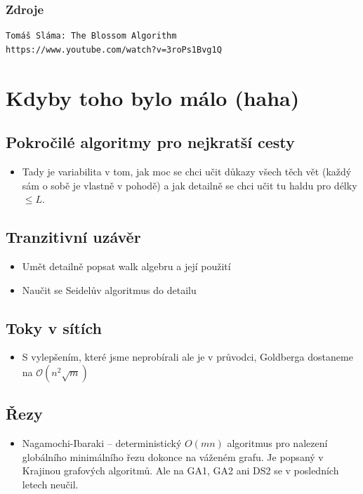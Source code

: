 \documentclass{article}
\theoremstyle{noparens}
\theoremstyle{noparens-mys}
\theoremstyle{noparens-note}
\newcommand{\OO}{\mathcal{O}}
\begin{document}
\subsubsection*{Zdroje}

\begin{verbatim}
Tomáš Sláma: The Blossom Algorithm
https://www.youtube.com/watch?v=3roPs1Bvg1Q
\end{verbatim}


\newpage
\section{Kdyby toho bylo málo (haha)}

\subsection{Pokročilé algoritmy pro nejkratší cesty}
\begin{itemize}
    \item Tady je variabilita v tom, jak moc se chci učit důkazy všech těch vět
        (každý sám o sobě je vlastně v pohodě) a jak detailně se chci učit tu
        haldu pro délky $\le L$.
\end{itemize}

\subsection{Tranzitivní uzávěr}
\begin{itemize}
    \item Umět detailně popsat walk algebru a její použití
    \item Naučit se Seidelův algoritmus do detailu
\end{itemize}

\subsection{Toky v sítích}
\begin{itemize}
    \item S vylepšením, které jsme neprobírali ale je v průvodci, Goldberga
        dostaneme na $\OO(n^2 \sqrt{m})$
\end{itemize}

\subsection{Řezy}
\begin{itemize}
    \item Nagamochi-Ibaraki -- deterministický $O(mn)$ algoritmus pro nalezení
        globálního minimálního řezu dokonce na váženém grafu. Je popsaný v
        Krajinou grafových algoritmů. Ale na GA1, GA2 ani DS2 se v posledních
        letech neučil.
\end{itemize}
\end{document}
